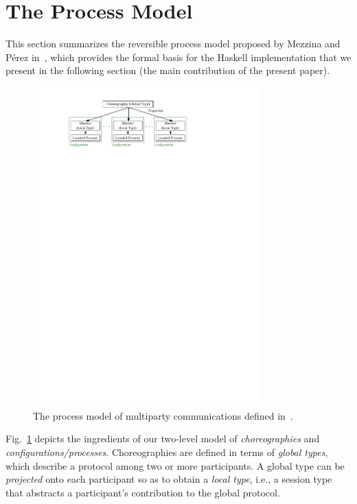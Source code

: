 \documentclass[runningheads]{llncs}
\begin{document}
\section{The Process Model}

This section summarizes the reversible process model proposed by Mezzina and P\'{e}rez in~\cite{DBLP:conf/ppdp/MezzinaP17}, which provides the formal basis for the Haskell implementation that we present in the following section (the main contribution of the present paper).

\begin{figure}[!t]
\begin{center}
    \includegraphics[width=8.7cm]{./img/figmodel.pdf}
\end{center}
\vspace{-4mm}
\caption{The process model of multiparty communications defined in~\cite{DBLP:conf/ppdp/MezzinaP17}.}\label{f:model}
\vspace{-4mm}
\end{figure}
Fig.~\ref{f:model} depicts the ingredients of our
two-level model of \emph{choreographies} and \emph{configurations/processes}.
Choreographies are defined in terms of \emph{global types}, which describe a protocol among two or more participants. 
A global type can be \emph{projected} onto each participant so as to obtain 
a \emph{local type}, i.e., a session type that abstracts a participant's contribution to the global protocol. 
\end{document}
